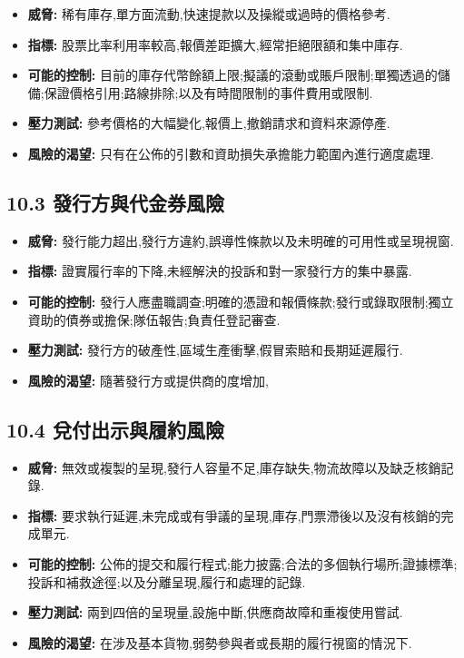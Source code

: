 \documentclass[11pt]{article}
\begin{document}
\begin{itemize}[leftmargin=*]
\item \textbf{威脅:} 稀有庫存,單方面流動,快速提款以及操縱或過時的價格參考.
\item \textbf{指標:} 股票比率利用率較高,報價差距擴大,經常拒絕限額和集中庫存.
\item \textbf{可能的控制:} 目前的庫存代幣餘額上限;擬議的滾動或賬戶限制;單獨透過的儲備;保證價格引用;路線排除;以及有時間限制的事件費用或限制.
\item \textbf{壓力測試:} 參考價格的大幅變化,報價上,撤銷請求和資料來源停產.
\item \textbf{風險的渴望:} 只有在公佈的引數和資助損失承擔能力範圍內進行適度處理.
\end{itemize}
\subsection*{10.3 發行方與代金券風險}

\begin{itemize}[leftmargin=*]
\item \textbf{威脅:} 發行能力超出,發行方違約,誤導性條款以及未明確的可用性或呈現視窗.
\item \textbf{指標:} 證實履行率的下降,未經解決的投訴和對一家發行方的集中暴露.
\item \textbf{可能的控制:} 發行人應盡職調查;明確的憑證和報價條款;發行或錄取限制;獨立資助的債券或擔保;隊伍報告;負責任登記審查.
\item \textbf{壓力測試:} 發行方的破產性,區域生產衝擊,假冒索賠和長期延遲履行.
\item \textbf{風險的渴望:} 隨著發行方或提供商的度增加,
\end{itemize}
\subsection*{10.4 兌付出示與履約風險}

\begin{itemize}[leftmargin=*]
\item \textbf{威脅:} 無效或複製的呈現,發行人容量不足,庫存缺失,物流故障以及缺乏核銷記錄.
\item \textbf{指標:} 要求執行延遲,未完成或有爭議的呈現,庫存,門票滯後以及沒有核銷的完成單元.
\item \textbf{可能的控制:} 公佈的提交和履行程式;能力披露;合法的多個執行場所;證據標準;投訴和補救途徑;以及分離呈現,履行和處理的記錄.
\item \textbf{壓力測試:} 兩到四倍的呈現量,設施中斷,供應商故障和重複使用嘗試.
\item \textbf{風險的渴望:} 在涉及基本貨物,弱勢參與者或長期的履行視窗的情況下.
\end{itemize}
\end{document}
